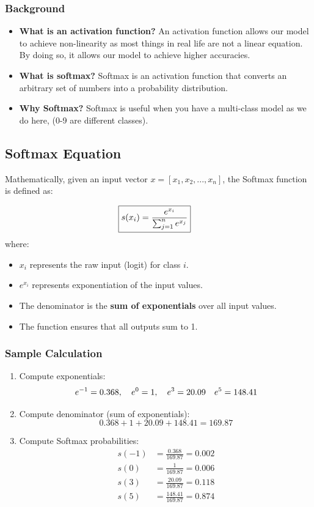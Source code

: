 \documentclass{article}
\begin{document}
\subsubsection{Background} 
\begin{itemize}
  \item \textbf{What is an activation function?}
    An activation function allows our model to achieve non-linearity as most things in real life are not a linear equation. By doing so, it allows our model to achieve higher accuracies.
  \item \textbf{What is softmax?} 
    Softmax is an activation function that converts an arbitrary set of numbers into a probability distribution. 
  \item \textbf{Why Softmax?} 
      Softmax is useful when you have a multi-class model as we do here, (0-9 are different classes). 
\end{itemize}

\subsection{Softmax Equation} 
Mathematically, given an input vector \( x = [x_1, x_2, ..., x_n] \), the Softmax function is defined as:

\begin{align*}
  \Aboxed{s(x_i) = \frac{e^{x_i}}{\sum_{j=1}^{n} e^{x_j}}}
\end{align*}
where:
\begin{itemize}
    \item \( x_i \) represents the raw input (logit) for class \( i \).
    \item \( e^{x_i} \) represents exponentiation of the input values.
    \item The denominator is the \textbf{sum of exponentials} over all input values.
    \item The function ensures that all outputs sum to 1.
\end{itemize}
\subsubsection{Sample Calculation} 
\begin{enumerate}
    \item Compute exponentials:
    \[
    e^{-1} = 0.368, \quad e^0 = 1, \quad e^3 = 20.09 \\
    \quad e^5 = 148.41
    \]

    \item Compute denominator (sum of exponentials):
    \[
    0.368 + 1 + 20.09 + 148.41 = 169.87
    \]

    \item Compute Softmax probabilities:
    \begin{align*}
      s(-1) &= \frac{0.368}{169.87} = 0.002\\ 
      s(0) &= \frac{1}{169.87} = 0.006\\ 
      s(3) &= \frac{20.09}{169.87} = 0.118\\ 
      s(5) &= \frac{148.41}{169.87} = 0.874
    \end{align*}
\end{enumerate}
\end{document}
